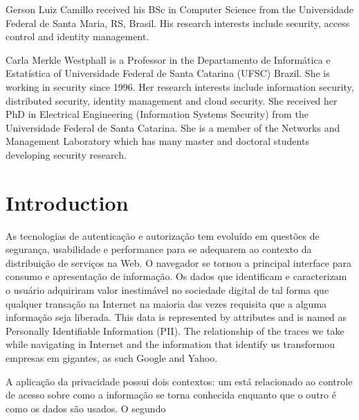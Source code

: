 \documentclass{doublecol-new}
\begin{document}
\begin{bio}
Gerson Luiz Camillo received his BSc in Computer Science from the Universidade Federal de Santa Maria, RS, Brasil. His research interests include security, access control and identity management.

\noindent Carla Merkle Westphall is a Professor in the Departamento de Informática e Estatística of Universidade Federal de Santa Catarina (UFSC) Brazil. She is working in security since 1996. Her research interests include information security, distributed security, identity management and cloud security. She received her PhD in Electrical Engineering (Information Systems Security) from the Universidade Federal de Santa Catarina. She is a member of the Networks and Management Laboratory which has many master and doctoral students developing security research.

\end{bio}

\maketitle

\section{Introduction}

As tecnologias de autenticação e autorização tem evoluído em questões de segurança, usabilidade e performance para se adequarem ao contexto da distribuição de serviços na Web. O navegador se tornou a principal interface para consumo e apresentação de informação. Os dados que identificam e caracterizam o usuário adquiriram valor inestimável no sociedade digital de tal forma que qualquer transação na Internet na maioria das vezes requisita que a alguma informação seja liberada. 
This data is represented by attributes and is named as Personally Identifiable Information (PII). The relationship of the traces we take while navigating in Internet and the information that identify us transformou empresas em gigantes, as such Google and Yahoo.

A aplicação da privacidade possui dois contextos\cite{kagal2010access}: um está relacionado ao controle de acesso sobre como a informação se torna conhecida enquanto que o outro é como os dados são usados. O segundo 
\end{document}

